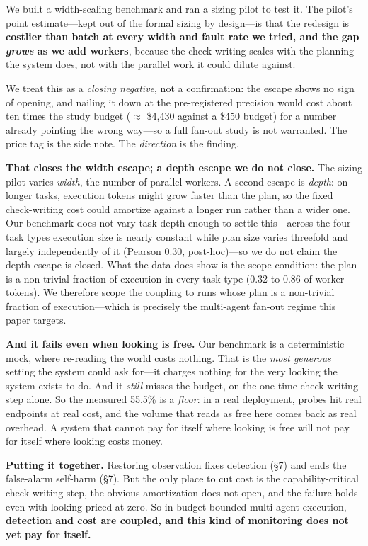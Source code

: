\documentclass[acmsmall,screen]{acmart}
\begin{document}
We built a width-scaling benchmark and ran a sizing pilot to test it. The
pilot's point estimate---kept out of the formal sizing by design---is that the
redesign is \textbf{costlier than batch at every width and fault rate we tried,
and the gap \emph{grows} as we add workers}, because the check-writing scales
with the planning the system does, not with the parallel work it could dilute
against.

We treat this as a \emph{closing negative}, not a confirmation: the escape shows
no sign of opening, and nailing it down at the pre-registered precision would
cost about ten times the study budget ($\approx$ \$4,430 against a \$450 budget)
for a number already pointing the wrong way---so a full fan-out study is not
warranted. The price tag is the side note. The \emph{direction} is the finding.

\textbf{That closes the width escape; a depth escape we do not close.} The sizing
pilot varies \emph{width}, the number of parallel workers. A second escape is
\emph{depth}: on longer tasks, execution tokens might grow faster than the plan,
so the fixed check-writing cost could amortize against a longer run rather than a
wider one. Our benchmark does not vary task depth enough to settle this---across
the four task types execution size is nearly constant while plan size varies
threefold and largely independently of it (Pearson 0.30, post-hoc)---so we do not
claim the depth escape is closed. What the data does show is the scope condition:
the plan is a non-trivial fraction of execution in every task type (0.32 to 0.86
of worker tokens). We therefore scope the coupling to runs whose plan is a
non-trivial fraction of execution---which is precisely the multi-agent fan-out
regime this paper targets.

\textbf{And it fails even when looking is free.} Our benchmark is a
deterministic mock, where re-reading the world costs nothing. That is the
\emph{most generous} setting the system could ask for---it charges nothing for
the very looking the system exists to do. And it \emph{still} misses the budget,
on the one-time check-writing step alone. So the measured 55.5\% is a
\emph{floor}: in a real deployment, probes hit real endpoints at real cost, and
the volume that reads as free here comes back as real overhead. A system that
cannot pay for itself where looking is free will not pay for itself where
looking costs money.

\textbf{Putting it together.} Restoring observation fixes detection (\S7) and
ends the false-alarm self-harm (\S7). But the only place to cut cost is the
capability-critical check-writing step, the obvious amortization does not open,
and the failure holds even with looking priced at zero. So in budget-bounded
multi-agent execution, \textbf{detection and cost are coupled, and this kind of
monitoring does not yet pay for itself.}
\end{document}
